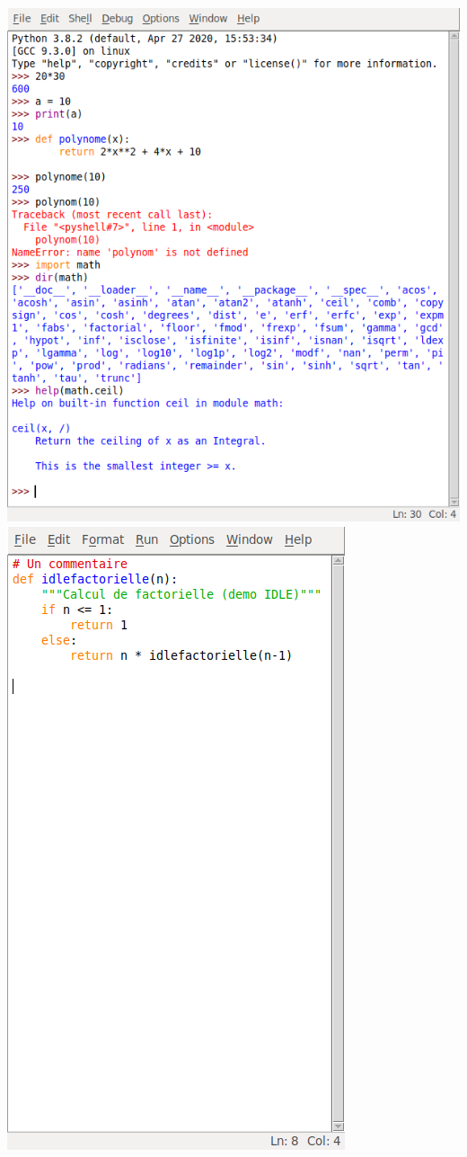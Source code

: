\begin{jazzfigure*}
\centering
\includegraphics[scale=0.475]{./Images/Chapter10/figX-01a-idleconsole.png}%
\hfill%
\includegraphics[scale=0.475]{./Images/Chapter10/figX-01b-idleeditor.png}%

\end{jazzfigure*}
